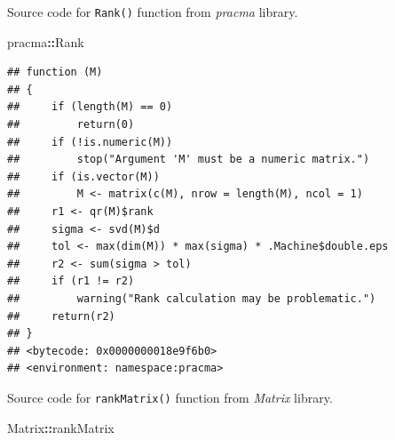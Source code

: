 \documentclass[
]{book}
\newenvironment{Shaded}{\begin{snugshade}}{\end{snugshade}}
\newcommand{\NormalTok}[1]{#1}
\newcommand{\OperatorTok}[1]{\textcolor[rgb]{0.81,0.36,0.00}{\textbf{#1}}}
\begin{document}
Source code for \texttt{Rank()} function from \emph{pracma} library.

\begin{Shaded}
\begin{Highlighting}[]
\NormalTok{pracma}\OperatorTok{::}\NormalTok{Rank}
\end{Highlighting}
\end{Shaded}

\begin{verbatim}
## function (M) 
## {
##     if (length(M) == 0) 
##         return(0)
##     if (!is.numeric(M)) 
##         stop("Argument 'M' must be a numeric matrix.")
##     if (is.vector(M)) 
##         M <- matrix(c(M), nrow = length(M), ncol = 1)
##     r1 <- qr(M)$rank
##     sigma <- svd(M)$d
##     tol <- max(dim(M)) * max(sigma) * .Machine$double.eps
##     r2 <- sum(sigma > tol)
##     if (r1 != r2) 
##         warning("Rank calculation may be problematic.")
##     return(r2)
## }
## <bytecode: 0x0000000018e9f6b0>
## <environment: namespace:pracma>
\end{verbatim}

Source code for \texttt{rankMatrix()} function from \emph{Matrix} library.

\begin{Shaded}
\begin{Highlighting}[]
\NormalTok{Matrix}\OperatorTok{::}\NormalTok{rankMatrix}
\end{Highlighting}
\end{Shaded}
\end{document}
